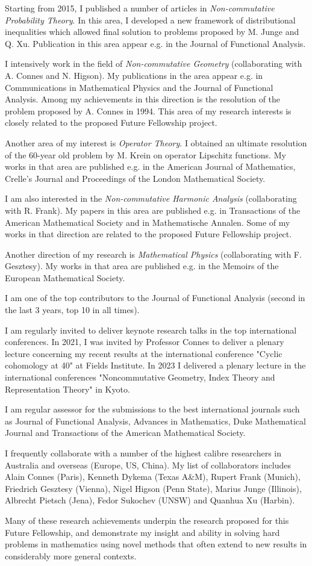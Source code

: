 \documentclass[12pt]{article}
\begin{document}
Starting from 2015, I published a number of articles in {\it Non-commutative Probability Theory}. In this area, I developed a new framework of distributional inequalities which allowed final solution to problems proposed by M. Junge and Q. Xu. Publication in this area appear e.g. in the Journal of Functional Analysis. 

I intensively work in the field of {\it Non-commutative Geometry} (collaborating with A. Connes and N. Higson). My publications in the area appear e.g. in Communications in Mathematical Physics and the Journal of Functional Analysis. Among my achievements in this direction is the resolution of the problem proposed by A. Connes in 1994. This area of my research interests is closely related to the proposed Future Fellowship project.

Another area of my interest is {\it Operator Theory}. I obtained an ultimate resolution of the 60-year old problem by M. Krein on operator Lipschitz functions. My works in that area are published e.g. in the  American Journal of Mathematics, Crelle's Journal and Proceedings of the London Mathematical Society.

I am also interested in the {\it Non-commutative Harmonic Analysis} (collaborating  with R. Frank). My papers in this area are published e.g. in Transactions of the American Mathematical Society and in Mathematische Annalen. Some of my works in that direction are related to the proposed Future Fellowship project.

Another direction of my research is {\it Mathematical Physics} (collaborating with F. Gesztesy). My works in that area are published e.g. in the Memoirs of the European Mathematical Society.

I am one of the top contributors to the Journal of Functional Analysis (second in the last 3 years, top 10 in all times). 

I am regularly invited to deliver keynote research talks in the top international conferences. In 2021, I was invited by Professor Connes to deliver a plenary lecture concerning my recent results at the international conference "Cyclic cohomology at 40" at Fields Institute. In 2023 I delivered a plenary lecture in the international conferences "Noncommutative Geometry, Index Theory and Representation Theory" in Kyoto.

I am regular assessor for the submissions to the best international journals such as Journal of Functional Analysis, Advances in Mathematics, Duke Mathematical Journal and Transactions of the American Mathematical Society.

I frequently collaborate with a number of the highest calibre researchers in Australia and overseas (Europe, US, China). My list of collaborators includes Alain Connes (Paris), Kenneth Dykema (Texas A\&M), Rupert Frank (Munich), Friedrich Gesztesy (Vienna), Nigel Higson (Penn State), Marius Junge (Illinois), Albrecht Pietsch (Jena), Fedor Sukochev (UNSW) and Quanhua Xu (Harbin). 


Many of these research achievements underpin the research proposed for this Future Fellowship, and demonstrate my insight and ability in solving hard problems in mathematics using novel methods that often extend to new results in considerably more general contexts.
\end{document}
